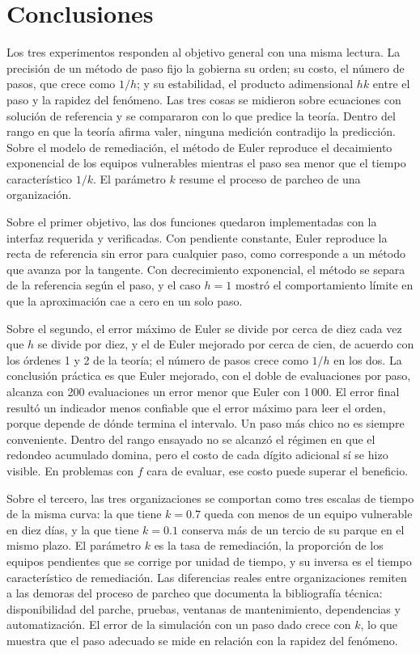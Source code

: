 \section{Conclusiones}
\label{sec:conclusiones}

Los tres experimentos responden al objetivo general con una misma lectura. La precisión de un
método de paso fijo la gobierna su orden; su costo, el número de pasos, que crece como $1/h$; y
su estabilidad, el producto adimensional $hk$ entre el paso y la rapidez del fenómeno. Las tres
cosas se midieron sobre ecuaciones con solución de referencia y se compararon con lo que predice
la teoría. Dentro del rango en que la teoría afirma valer, ninguna medición contradijo la
predicción. Sobre el modelo de remediación, el método de Euler reproduce el
decaimiento exponencial de los equipos vulnerables mientras el paso sea menor que el tiempo
característico $1/k$. El parámetro $k$ resume el proceso de parcheo de una organización.

Sobre el primer objetivo, las dos funciones quedaron implementadas con la interfaz requerida
y verificadas. Con pendiente constante, Euler reproduce la recta de referencia sin error para
cualquier paso, como corresponde a un método que avanza por la tangente. Con decrecimiento
exponencial, el método se separa de la referencia según el paso, y el caso $h = 1$ mostró el
comportamiento límite en que la aproximación cae a cero en un solo paso.

Sobre el segundo, el error máximo de Euler se divide por cerca de diez cada vez que $h$ se divide
por diez, y el de Euler mejorado por cerca de cien, de acuerdo con los órdenes 1 y 2 de la
teoría; el número de pasos crece como $1/h$ en los dos. La conclusión práctica es que Euler
mejorado, con el doble de evaluaciones por paso, alcanza con 200 evaluaciones un error menor que
Euler con 1\,000. El error final resultó un indicador menos confiable que el error máximo para
leer el orden, porque depende de dónde termina el intervalo. Un paso más chico no es siempre
conveniente. Dentro del rango ensayado no se alcanzó el régimen en que el redondeo acumulado
domina, pero el costo de cada dígito adicional sí se hizo visible. En problemas con $f$ cara
de evaluar, ese costo puede superar el beneficio.

Sobre el tercero, las tres organizaciones se comportan como tres escalas de tiempo de la misma
curva: la que tiene $k = 0.7$ queda con menos de un equipo vulnerable en diez días, y la que
tiene $k = 0.1$ conserva más de un tercio de su parque en el mismo plazo. El parámetro $k$ es la
tasa de remediación, la proporción de los equipos pendientes que se corrige por unidad de
tiempo, y su inversa es el tiempo característico de remediación. Las diferencias reales entre organizaciones remiten a las demoras
del proceso de parcheo que documenta la bibliografía técnica: disponibilidad del parche,
pruebas, ventanas de mantenimiento, dependencias y automatización. El error de la simulación
con un paso dado crece con $k$, lo que muestra que el paso adecuado se mide en relación con la
rapidez del fenómeno.

